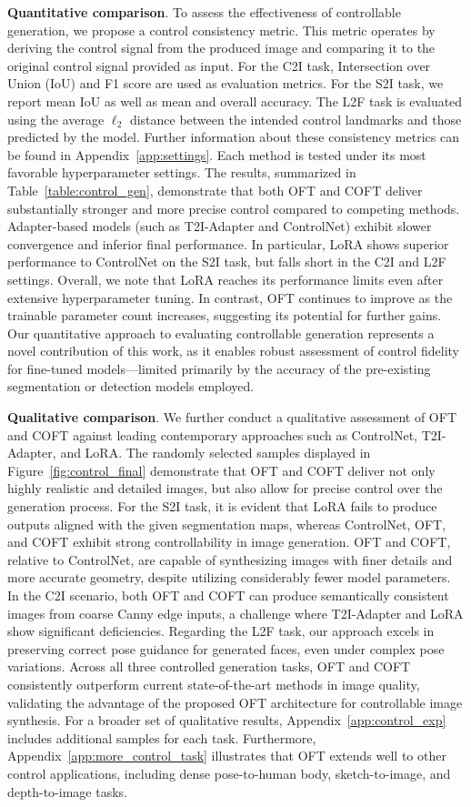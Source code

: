 \textbf{Quantitative comparison}. To assess the effectiveness of controllable generation, we propose a control consistency metric. This metric operates by deriving the control signal from the produced image and comparing it to the original control signal provided as input. For the C2I task, Intersection over Union (IoU) and F1 score are used as evaluation metrics. For the S2I task, we report mean IoU as well as mean and overall accuracy. The L2F task is evaluated using the average $\ell_2$ distance between the intended control landmarks and those predicted by the model. Further information about these consistency metrics can be found in Appendix~\ref{app:settings}. Each method is tested under its most favorable hyperparameter settings. The results, summarized in Table~\ref{table:control_gen}, demonstrate that both OFT and COFT deliver substantially stronger and more precise control compared to competing methods. Adapter-based models (such as T2I-Adapter and ControlNet) exhibit slower convergence and inferior final performance. In particular, LoRA shows superior performance to ControlNet on the S2I task, but falls short in the C2I and L2F settings. Overall, we note that LoRA reaches its performance limits even after extensive hyperparameter tuning. In contrast, OFT continues to improve as the trainable parameter count increases, suggesting its potential for further gains. Our quantitative approach to evaluating controllable generation represents a novel contribution of this work, as it enables robust assessment of control fidelity for fine-tuned models—limited primarily by the accuracy of the pre-existing segmentation or detection models employed.

\textbf{Qualitative comparison}. We further conduct a qualitative assessment of OFT and COFT against leading contemporary approaches such as ControlNet, T2I-Adapter, and LoRA. The randomly selected samples displayed in Figure~\ref{fig:control_final} demonstrate that OFT and COFT deliver not only highly realistic and detailed images, but also allow for precise control over the generation process. For the S2I task, it is evident that LoRA fails to produce outputs aligned with the given segmentation maps, whereas ControlNet, OFT, and COFT exhibit strong controllability in image generation. OFT and COFT, relative to ControlNet, are capable of synthesizing images with finer details and more accurate geometry, despite utilizing considerably fewer model parameters. In the C2I scenario, both OFT and COFT can produce semantically consistent images from coarse Canny edge inputs, a challenge where T2I-Adapter and LoRA show significant deficiencies. Regarding the L2F task, our approach excels in preserving correct pose guidance for generated faces, even under complex pose variations. Across all three controlled generation tasks, OFT and COFT consistently outperform current state-of-the-art methods in image quality, validating the advantage of the proposed OFT architecture for controllable image synthesis. For a broader set of qualitative results, Appendix~\ref{app:control_exp} includes additional samples for each task. Furthermore, Appendix~\ref{app:more_control_task} illustrates that OFT extends well to other control applications, including dense pose-to-human body, sketch-to-image, and depth-to-image tasks.

